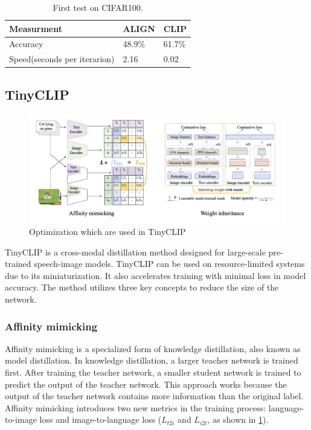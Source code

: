         \begin{table}
            \centering
            \begin{tabular}{lll}
                \hline
            \textbf{Measurment}&\textbf{ALIGN}&\textbf{CLIP}\\\hline
            Accuracy& 48.9\% & 61.7\%\\
            Speed(seconds per iterarion)&  2.16&  0.02\\ \hline
            \end{tabular}
            \caption{First test on CIFAR100.}
            \label{tab:clipaligntest}
        \end{table}

        \subsection{TinyCLIP
            \label{section:tinyclip}}
        \begin{figure}
            \centering
            \includegraphics[width=\textwidth]{Images/crossmodalnetworks/TinyCLIP.jpg}
            \caption{Optimization which are used in TinyCLIP\cite{tinyclip}}
            \label{fig:crossmodalnetworks:tinyclip}
        \end{figure}

        TinyCLIP \cite{tinyclip} is a cross-modal distillation method designed for large-scale pre-trained speech-image models. 
        TinyCLIP can be used on resource-limited systems due to its miniaturization. 
        It also accelerates training with minimal loss in model accuracy. 
        The method utilizes three key concepts to reduce the size of the network.


        \subsubsection{Affinity mimicking}
        Affinity mimicking is a specialized form of knowledge distillation, also known as model distillation. 
        In knowledge distillation, a larger teacher network is trained first. 
        After training the teacher network, a smaller student network is trained to predict the output of the teacher network. 
        This approach works because the output of the teacher network contains more information than the original label. 
        Affinity mimicking introduces two new metrics in the training process: language-to-image loss and image-to-language loss (\(L_{t2i}\) and \(L_{i2t}\), as shown in \cref{fig:crossmodalnetworks:tinyclip}).



